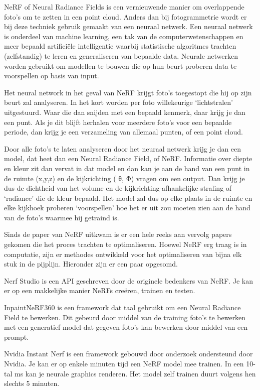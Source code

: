 NeRF of Neural Radiance Fields is een vernieuwende manier om overlappende foto’s om te zetten in een point cloud. Anders dan bij fotogrammetrie wordt er bij deze techniek gebruik gemaakt van een neuraal netwerk.
Een neuraal netwerk is onderdeel van machine learning, een tak van de computerwetenschappen en meer bepaald artificiële intelligentie waarbij statistische algoritmes trachten (zelfstandig)  te leren en generaliseren van bepaalde data. Neurale netwerken worden gebruikt om modellen te bouwen die op hun beurt proberen data te voorspellen op basis van input.

Het neural network in het geval van NeRF krijgt foto’s toegestopt die hij op zijn beurt zal analyseren. In het kort worden per foto willekeurige ‘lichtstralen’ uitgestuurd. Waar die dan snijden met een bepaald kenmerk, daar krijg je dan een punt. Als je dit blijft herhalen voor meerdere foto’s voor een bepaalde periode, dan krijg je een verzameling van allemaal punten, of een point cloud.

Door alle foto’s te laten analyseren door het neuraal netwerk krijg je dan een model, dat heet dan een Neural Radiance Field, of NeRF. Informatie over diepte en kleur zit dan vervat in dat model en dan kan je aan de hand van een punt in de ruimte (x,y,z) en de kijkrichting ( θ, Φ) vragen om een output. Dan krijg je dus de dichtheid van het volume en de kijkrichting-afhankelijke straling of ‘radiance’ die de kleur bepaald. Het model zal dus  op elke plaats in de ruimte en elke kijkhoek proberen ‘voorspellen’ hoe het er uit zou moeten zien aan de hand van de foto’s waarmee hij getraind is. \autocite{Mildenhall2020}

Sinds de paper van NeRF uitkwam is er een hele reeks aan vervolg papers gekomen die het proces trachten te optimaliseren. Hoewel NeRF erg traag is in computatie, zijn er methodes ontwikkeld voor het optimaliseren van bijna elk stuk in de pijplijn. Hieronder zijn er een paar opgesomd.

Nerf Studio is een API  geschreven door de originele bedenkers van NeRF. Je kan er op een makkelijke manier NeRFs creëren, trainen en testen. \autocite{Tancik2023a}

InpaintNeRF360 is een framework dat taal gebruikt om een Neural Radiance Field te bewerken. Dit gebeurd door middel van de training foto’s te bewerken met een generatief model dat gegeven foto’s kan bewerken door middel van een prompt. \autocite{Wang2023a}


Nvidia Instant Nerf is een framework gebouwd door onderzoek ondersteund door Nvidia. Je kan er op enkele minuten tijd een NeRF model mee trainen. In een 10-tal ms kan je neurale graphics renderen. Het model zelf trainen duurt volgens hen slechts 5 minuten.
\autocite{Mueller2022}

